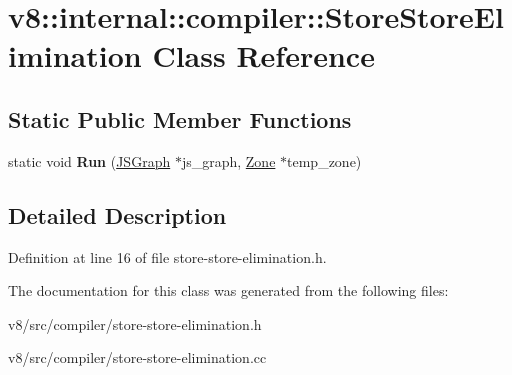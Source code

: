 \hypertarget{classv8_1_1internal_1_1compiler_1_1StoreStoreElimination}{}\section{v8\+:\+:internal\+:\+:compiler\+:\+:Store\+Store\+Elimination Class Reference}
\label{classv8_1_1internal_1_1compiler_1_1StoreStoreElimination}
\subsection*{Static Public Member Functions}
\begin{DoxyCompactItemize}
\item 
\mbox{\label{classv8_1_1internal_1_1compiler_1_1StoreStoreElimination_a6f1c55dea45acdc1e83c1896c38d7a30}} 
static void {\bfseries Run} (\mbox{\hyperlink{classv8_1_1internal_1_1compiler_1_1JSGraph}{J\+S\+Graph}} $\ast$js\+\_\+graph, \mbox{\hyperlink{classv8_1_1internal_1_1Zone}{Zone}} $\ast$temp\+\_\+zone)
\end{DoxyCompactItemize}


\subsection{Detailed Description}


Definition at line 16 of file store-\/store-\/elimination.\+h.



The documentation for this class was generated from the following files\+:\begin{DoxyCompactItemize}
\item 
v8/src/compiler/store-\/store-\/elimination.\+h\item 
v8/src/compiler/store-\/store-\/elimination.\+cc\end{DoxyCompactItemize}
